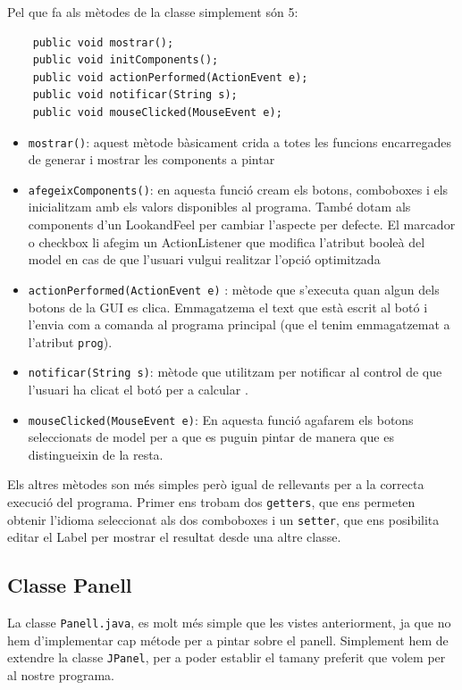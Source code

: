 \documentclass[conference]{IEEEtran}
\begin{document}
Pel que fa als mètodes de la classe simplement són 5:
\begin{verbatim}
    public void mostrar();
    public void initComponents();
    public void actionPerformed(ActionEvent e);
    public void notificar(String s);
    public void mouseClicked(MouseEvent e);
\end{verbatim}
\begin{itemize}
    \item \texttt{mostrar()}: aquest mètode bàsicament crida a totes les funcions encarregades de generar i mostrar les components a pintar\\
    \item \texttt{afegeixComponents()}: en aquesta funció cream els botons, comboboxes i els inicialitzam amb els valors disponibles al programa. També dotam als components d'un LookandFeel per cambiar l'aspecte per defecte. El marcador o checkbox li afegim un ActionListener que modifica l'atribut booleà del model en cas de que l'usuari vulgui realitzar l'opció optimitzada\\
    \item \texttt{actionPerformed(ActionEvent e)} : mètode que s'executa quan algun dels botons de la GUI es clica. Emmagatzema el text que està escrit al botó i l'envia com a comanda al programa principal (que el tenim emmagatzemat a l'atribut \texttt{prog}).\\
    \item \texttt{notificar(String s)}: mètode que utilitzam per notificar al control de que l'usuari ha clicat el botó per a calcular .\\
    \item  \texttt{mouseClicked(MouseEvent e)}: En aquesta funció agafarem els botons seleccionats de model per a que es puguin pintar de manera que es distingueixin de la resta.
\end{itemize}

Els altres mètodes son més simples però igual de rellevants per a la correcta execució del programa. Primer ens trobam dos \texttt{getters}, que ens permeten obtenir l'idioma seleccionat als dos comboboxes i un \texttt{setter}, que ens posibilita editar el Label per mostrar el resultat desde una altre classe.

\subsection{Classe Panell}

La classe \texttt{Panell.java}, es molt més simple que les vistes anteriorment, ja que no hem d'implementar cap métode per a pintar sobre el panell. Simplement hem de extendre la classe \texttt{JPanel}, per a poder establir el tamany preferit que volem per al nostre programa.
\end{document}
